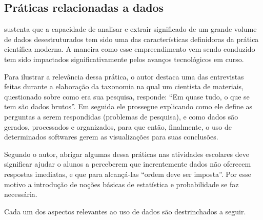 \subsection{Práticas relacionadas a dados}

 sustenta que a capacidade de analisar e extrair significado de um grande volume de dados desestruturados tem sido uma das características definidoras da prática científica moderna. A maneira como esse empreendimento vem sendo conduzido tem sido impactados significativamente pelos avanços tecnológicos em curso. 

Para ilustrar a relevância dessa prática, o autor destaca uma das entrevistas feitas durante a elaboração da taxonomia na qual um cientista de materiais, questionado sobre como era sua pesquisa, responde: ``Em quase tudo, o que se tem são dados brutos''. Em seguida ele prossegue explicando como ele define as perguntas a serem respondidas (problemas de pesquisa), e como dados são gerados, processados e organizados, para que então, finalmente, o uso de determinados softwares gerem as visualizações para suas conclusões. 


Segundo o autor, abrigar algumas dessa práticas nas atividades escolares deve significar ajudar o alunos a perceberem que inerentemente dados não oferecem respostas imediatas, e que para alcançá-las ``ordem deve ser imposta''. Por esse motivo a introdução de noções básicas de estatística e probabilidade se faz necessária.

Cada um dos aspectos relevantes ao uso de dados são destrinchados a seguir.


